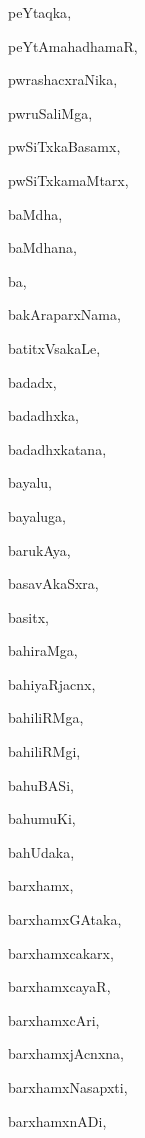 \begin{multicols}{2}
{peYtaqka}, \pageref{peYtaqka}

{peYtAmahadhamaR}, \pageref{peYtAmahadhamaR}

{pwrashacxraNika}, \pageref{pwrashacxraNika}

{pwruSaliMga}, \pageref{pwruSaliMga}

{pwSiTxkaBasamx}, \pageref{pwSiTxkaBasamx}

{pwSiTxkamaMtarx}, \pageref{pwSiTxkamaMtarx}

{baMdha}, \pageref{baMdha}

{baMdhana}, \pageref{baMdhana}

{ba}, \pageref{ba}

{bakAraparxNama}, \pageref{bakAraparxNama}

{batitxVsakaLe}, \pageref{batitxVsakaLe}

{badadx}, \pageref{badadx}

{badadhxka}, \pageref{badadhxka}

{badadhxkatana}, \pageref{badadhxkatana}

{bayalu}, \pageref{bayalu}

{bayaluga}, \pageref{bayaluga}

{barukAya}, \pageref{barukAya}

{basavAkaSxra}, \pageref{basavAkaSxra}

{basitx}, \pageref{basitx}

{bahiraMga}, \pageref{bahiraMga}

{bahiyaRjacnx}, \pageref{bahiyaRjacnx}

{bahiliRMga}, \pageref{bahiliRMga}

{bahiliRMgi}, \pageref{bahiliRMgi}

{bahuBASi}, \pageref{bahuBASi}

{bahumuKi}, \pageref{bahumuKi}

{bahUdaka}, \pageref{bahUdaka}

{barxhamx}, \pageref{barxhamx}

{barxhamxGAtaka}, \pageref{barxhamxGAtaka}

{barxhamxcakarx}, \pageref{barxhamxcakarx}

{barxhamxcayaR}, \pageref{barxhamxcayaR}

{barxhamxcAri}, \pageref{barxhamxcAri}

{barxhamxjAcnxna}, \pageref{barxhamxjAcnxna}

{barxhamxNasapxti}, \pageref{barxhamxNasapxti}

{barxhamxnADi}, \pageref{barxhamxnADi}


\end{multicols}
